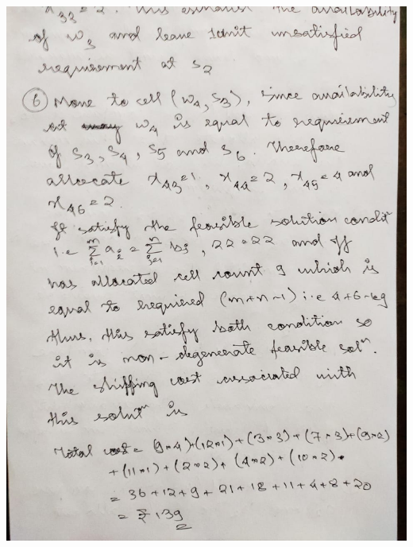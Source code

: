 \documentclass[12pt, letterpaper, twoside]{book}
\begin{document}
\includegraphics[width=\paperwidth, height=\paperheight]{Page12}
\end{document}
